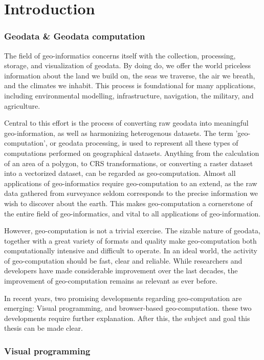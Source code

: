 \chapter{Introduction}

\subsection*{Geodata \& Geodata computation}

The field of geo-informatics concerns itself with the collection, processing, storage, and visualization of geodata. 
By doing do, we offer the world priceless information about the land we build on, the seas we traverse, the air we breath, and the climates we inhabit. 
This process is foundational for many applications, including environmental modelling, infrastructure, navigation, the military, and agriculture.   

Central to this effort is the process of converting raw geodata into meaningful geo-information, as well as harmonizing heterogenous datasets. 
The term 'geo-computation', or geodata processing, is used to represent all these types of computations performed on geographical datasets. Anything from the calculation of an area of a polygon, to CRS transformations, or converting a raster dataset into a vectorized dataset, can be regarded as geo-computation.
Almost all applications of geo-informatics require geo-computation to an extend, as the raw data gathered from surveyance seldom corresponds to the precise information we wish to discover about the earth.       
This makes geo-computation a cornerstone of the entire field of geo-informatics, and vital to all applications of geo-information.

However, geo-computation is not a trivial exercise. The sizable nature of geodata, together with a great variety of formats and quality make geo-computation both computationally intensive and difficult to operate. 
In an ideal world, the activity of geo-computation should be fast, clear and reliable.
While researchers and developers have made considerable improvement over the last decades, the improvement of geo-computation remains as relevant as ever before. 

In recent years, two promising developments regarding geo-computation are emerging:
Visual programming, and browser-based geo-computation. 
these two developments require further explanation. 
After this, the subject and goal this thesis can be made clear.

\subsection*{Visual programming}

